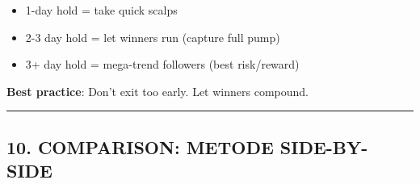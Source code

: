 \documentclass[
  10pt,
  a4paper,
]{article}
\providecommand{\tightlist}{%
  \setlength{\itemsep}{0pt}\setlength{\parskip}{0pt}}\usepackage{longtable,booktabs,array}
\begin{document}
\begin{itemize}
\tightlist
\item
  1-day hold = take quick scalps
\item
  2-3 day hold = let winners run (capture full pump)
\item
  3+ day hold = mega-trend followers (best risk/reward)
\end{itemize}

\textbf{Best practice}: Don't exit too early. Let winners compound.

\begin{center}\rule{0.5\linewidth}{0.5pt}\end{center}

\subsection{10. COMPARISON: METODE
SIDE-BY-SIDE}\label{comparison-metode-side-by-side}
\end{document}
